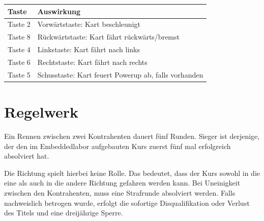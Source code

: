 \vspace{0.5cm}
\begin{tabular}{|l|l|}
\hline
\textbf{Taste} & \textbf{Auswirkung} \\ \hline
Taste 2 & Vorwärtstaste: Kart beschleunigt \\ \hline
Taste 8 & Rückwärtstaste: Kart fährt rückwärts/bremst \\ \hline
Taste 4 & Linkstaste: Kart fährt nach links \\ \hline
Taste 6 & Rechtstaste: Kart fährt nach rechts \\ \hline
Taste 5 & Schusstaste: Kart feuert Powerup ab, falls vorhanden \\ \hline 
\end{tabular}
\vspace{0.5cm}

\section{Regelwerk}
Ein Rennen zwischen zwei Kontrahenten dauert fünf Runden. Sieger ist derjenige, der den im Embeddedlabor aufgebauten Kurs zuerst fünf mal erfolgreich absolviert hat.


\begin{figure}[H]
	\center
\end{figure}


Die Richtung spielt hierbei keine Rolle. Das bedeutet, dass der Kurs sowohl in die eine als auch in die andere Richtung gefahren werden kann. Bei Uneinigkeit zwischen den Kontrahenten, muss eine Strafrunde absolviert werden. Falls nachweislich betrogen wurde, erfolgt die sofortige Disqualifikation oder Verlust des Titels und eine dreijährige Sperre. 

